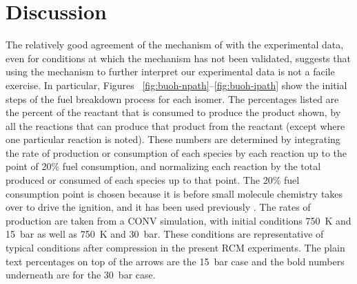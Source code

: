 \documentclass[12pt, letterpaper]{article}
\begin{document}
\section{Discussion}
\label{sec:buoh-discussion}

The relatively good agreement of the mechanism of \textcite{Sarathy2012} with
the experimental data, even for conditions at which the mechanism has not been
validated, suggests that using the mechanism to further interpret our
experimental data is not a facile exercise. In particular, Figures~
\ref{fig:buoh-npath}--\ref{fig:buoh-ipath} show the initial steps of the fuel
breakdown process for each isomer. The percentages listed are the percent of
the reactant that is consumed to produce the product shown, by all the
reactions that can produce that product from the reactant (except where one
particular reaction is noted). These numbers are determined by integrating the
rate of production or consumption of each species by each reaction up to the
point of 20\% fuel consumption, and normalizing each reaction by the total
produced or consumed of each species up to that point. The 20\% fuel
consumption point is chosen because it is before small molecule chemistry takes
over to drive the ignition, and it has been used previously
\cite{Weber2011,Sarathy2012}. The rates of production are taken from a CONV
simulation, with initial conditions \SI{750}{\kelvin} and \SI{15}{\bar} as well as \SI{750}{\kelvin} and
\SI{30}{\bar}. These conditions are representative of typical conditions after compression
in the present RCM experiments. The plain text percentages on top of the arrows
are the \SI{15}{\bar} case and the bold numbers underneath are for the \SI{30}{\bar} case.
\end{document}
